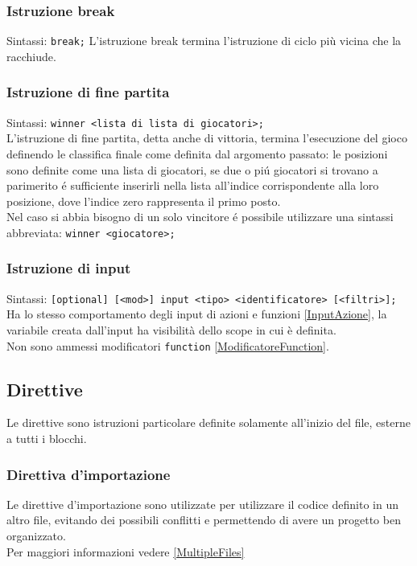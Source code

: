 \subsubsection{Istruzione break}
Sintassi: \lstinline|break;|
L'istruzione break termina l'istruzione di ciclo più vicina che la racchiude.

\subsubsection{Istruzione di fine partita}
Sintassi: \lstinline|winner <lista di lista di giocatori>;| \\
L'istruzione di fine partita, detta anche di vittoria, termina l'esecuzione del gioco definendo 
le classifica finale come definita dal argomento passato: le posizioni sono definite come una lista di giocatori,
se due o piú giocatori si trovano a parimerito é sufficiente inserirli nella lista all'indice corrispondente 
alla loro posizione, dove l'indice zero rappresenta il primo posto. \\
Nel caso si abbia bisogno di un solo vincitore é possibile utilizzare una sintassi abbreviata: 
\lstinline|winner <giocatore>;| 

\subsubsection{Istruzione di input}
Sintassi: \lstinline|[optional] [<mod>] input <tipo> <identificatore> [<filtri>];|
Ha lo stesso comportamento degli input di azioni e funzioni \ref{InputAzione}, la variabile
creata dall'input ha visibilità dello scope in cui è definita. \\
Non sono ammessi modificatori \lstinline|function| \ref{ModificatoreFunction}.


\subsection{Direttive}
Le direttive sono istruzioni particolare definite solamente all'inizio del file, esterne a 
tutti i blocchi.

\subsubsection{Direttiva d'importazione}
Le direttive d'importazione sono utilizzate per utilizzare il codice definito in un altro
file, evitando dei possibili conflitti e permettendo di avere un progetto ben organizzato. \\
Per maggiori informazioni vedere \ref{MultipleFiles}

